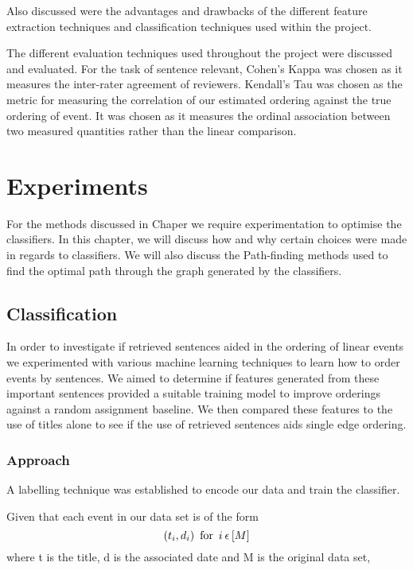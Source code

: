 \documentclass[bsc,frontabs,twoside,singlespacing,parskip,deptreport]{infthesis}     %
\begin{document}
Also discussed were the advantages and  drawbacks of the different feature extraction techniques and classification
techniques used within the project.

The different evaluation techniques used throughout the project were discussed and evaluated. 
For the task of sentence relevant, Cohen's Kappa \cite{wood2007understanding} was chosen as it measures the inter-rater agreement of
reviewers. Kendall's Tau \cite{abdi2007kendall} was chosen as the metric for measuring the correlation of our estimated ordering
against the true ordering of event. It was chosen as it measures the ordinal association between two
measured quantities rather than the linear comparison.


\chapter{Experiments}
For the methods discussed in Chaper \cite{chapter:methods} we require experimentation to optimise the classifiers.
In this chapter, we will discuss how and why certain choices were made in regards to classifiers.
We will also discuss the Path-finding methods used to find the optimal path through the graph generated by the
classifiers.

\section{Classification}
In order to investigate if retrieved sentences aided in the  ordering of linear events we experimented with various
machine learning techniques to learn how to order events by sentences.
We aimed to determine if features generated from these important sentences provided a suitable training model
to improve orderings against a random assignment baseline. We then compared these features to the use of titles alone
to see if the use of retrieved sentences aids single edge ordering.


\subsection{Approach}
A labelling technique was established to encode our data and train the classifier.

Given that each event in our data set is of the form
\begin{equation}
  (t_{i},d_{i}) \hspace{0.5em} \text{for} \hspace{0.5em} i \hspace{0.2em}\epsilon \hspace{0.2em} [M]\nonumber
    \end{equation}
    where t is the title, d is the associated date and M is the original data set,
\end{document}
